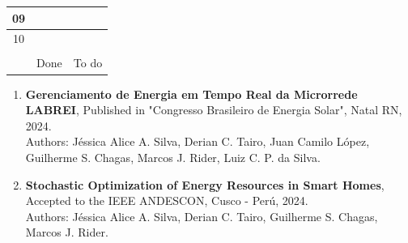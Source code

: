 \documentclass[preprint, 10pt, 5p]{elsarticle}
\begin{document}
\begin{table}[]
\begin{tabular}{cllll}
  \hline
\multicolumn{1}{|c|}{09} &
  \multicolumn{1}{l|}{} &
  \multicolumn{1}{l|}{} &
  \multicolumn{1}{l|}{} &
  \multicolumn{1}{l|}{\cellcolor[HTML]{ffb703}} \\ 
  \hline
\multicolumn{1}{|c|}{10} &
  \multicolumn{1}{l|}{} &
  \multicolumn{1}{l|}{} &
  \multicolumn{1}{l|}{} &
  \multicolumn{1}{l|}{\cellcolor[HTML]{ffb703}} \\ 
  \hline
&&&&\\
 &
  \multicolumn{2}{c}{\cellcolor[HTML]{bdc6d1}Done} &
  \multicolumn{2}{c}{\cellcolor[HTML]{ffb703}To do}
\end{tabular}
\end{table}

\begin{enumerate}
    \item \textbf{Gerenciamento de Energia em Tempo Real da 
    Microrrede LABREI}, Published in "Congresso Brasileiro de Energia 
    Solar", Natal RN, 2024.\\
    Authors: Jéssica Alice A. Silva, Derian C. Tairo, Juan Camilo López,
    Guilherme S. Chagas, Marcos J. Rider, Luiz C. P. da Silva. 
    \item \textbf{Stochastic Optimization of Energy Resources in Smart Homes},
    Accepted to the IEEE ANDESCON, Cusco - Perú, 2024.\\
    Authors: Jéssica Alice A. Silva, Derian C. Tairo,
    Guilherme S. Chagas, Marcos J. Rider.

\end{enumerate}
\end{document}
